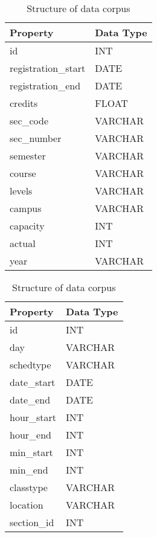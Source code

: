 	\begin{table}[H]
		\ContinuedFloat
		\begin{subtable}[b]{.5\linewidth}
			\centering
			\begin{tabular}{ll}
				\toprule
				Property & Data Type \\
				\midrule
				id & INT \\
				registration\_start & DATE \\
				registration\_end & DATE \\
				credits & FLOAT \\
				sec\_code & VARCHAR \\
				sec\_number & VARCHAR \\
				semester & VARCHAR \\
				course & VARCHAR \\
				levels & VARCHAR \\
				campus & VARCHAR \\
				capacity & INT \\
				actual & INT \\
				year & VARCHAR \\
				\bottomrule
			\end{tabular}
			
			\caption{Section Data Structure}
			\label{tbl:corpus-section}
		\end{subtable}
		\begin{subtable}[b]{.5\linewidth}
			\centering
			\begin{tabular}{ll}
				\toprule
				Property & Data Type \\
				\midrule
				id & INT \\
				day & VARCHAR \\
				schedtype & VARCHAR \\
				date\_start & DATE \\
				date\_end & DATE \\
				hour\_start & INT \\
				hour\_end & INT \\
				min\_start & INT \\
				min\_end & INT \\
				classtype & VARCHAR \\
				location & VARCHAR \\
				section\_id & INT \\
				\bottomrule
			\end{tabular}
			
			\caption{Schedule Data Structure}
			\label{tbl:corpus-schedule}
		\end{subtable}
		
		\caption{Structure of data corpus}
		\label{tbl:data-corpus-defn}
	\end{table}